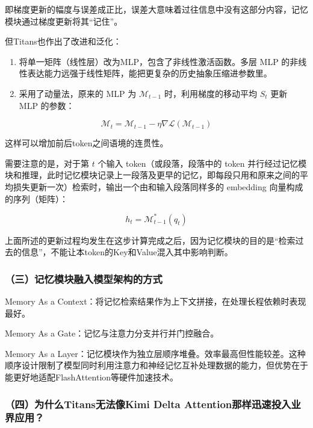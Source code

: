 即梯度更新的幅度与误差成正比，误差大意味着过往信息中没有这部分内容，记忆模块通过梯度更新将其``记住''。

但Titans也作出了改进和泛化：

\begin{enumerate}
\def\labelenumi{\arabic{enumi}.}
\item
  将单一矩阵（线性层）改为MLP，包含了非线性激活函数。多层 MLP 的非线性表达能力远强于线性矩阵，能把更复杂的历史抽象压缩进参数里。
\item
  采用了动量法，原来的 MLP 为 \(\mathcal{M}_{t-1}\) 时，利用梯度的移动平均 \(S_t\) 更新 MLP 的参数：
\end{enumerate}

\[
\mathcal{M}_t = \mathcal{M}_{t-1} - \eta \nabla \mathcal{L}(\mathcal{M}_{t-1})
\]

这样可以增加前后token之间语境的连贯性。

需要注意的是，对于第 \(t\) 个输入 token（或段落，段落中的 token 并行经过记忆模块和推理，此时记忆模块记录上一段落及更早的记忆，即每段只用和原来之间的平均损失更新一次）检索时，输出一个由和输入段落同样多的 embedding 向量构成的序列（矩阵）：

\[
h_t = \mathcal{M}^{*}_{t-1}(q_t)
\]

上面所述的更新过程均发生在这步计算完成之后，因为记忆模块的目的是``检索过去的信息''，不能让本token的Key和Value混入其中影响判断。

\hypertarget{ux4e09ux8bb0ux5fc6ux6a21ux5757ux878dux5165ux6a21ux578bux67b6ux6784ux7684ux65b9ux5f0f}{%
\subsubsection{（三）记忆模块融入模型架构的方式}\label{ux4e09ux8bb0ux5fc6ux6a21ux5757ux878dux5165ux6a21ux578bux67b6ux6784ux7684ux65b9ux5f0f}}

Memory As a Context：将记忆检索结果作为上下文拼接，在处理长程依赖时表现最好。

Memory As a Gate：记忆与注意力分支并行并门控融合。

Memory As a Layer：记忆模块作为独立层顺序堆叠。效率最高但性能较差。这种顺序设计限制了模型同时利用注意力和神经记忆互补处理数据的能力，但优势在于能更好地适配FlashAttention等硬件加速技术。

\hypertarget{ux56dbux4e3aux4ec0ux4e48titansux65e0ux6cd5ux50cfkimi-delta-attentionux90a3ux6837ux8fc5ux901fux6295ux5165ux4e1aux754cux5e94ux7528}{%
\subsubsection{（四）为什么Titans无法像Kimi Delta Attention那样迅速投入业界应用？}\label{ux56dbux4e3aux4ec0ux4e48titansux65e0ux6cd5ux50cfkimi-delta-attentionux90a3ux6837ux8fc5ux901fux6295ux5165ux4e1aux754cux5e94ux7528}}

